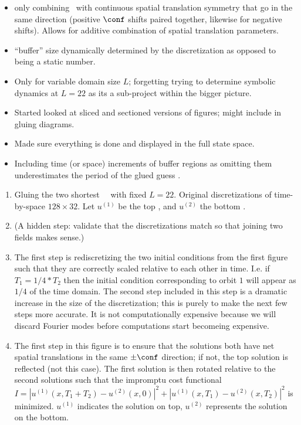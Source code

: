 \begin{description}
{\begin{description}
\begin{itemize}
\item only combining \twots\ with continuous spatial translation symmetry that go in the same direction (positive $\conf$ shifts paired together, likewise for negative shifts). Allows for additive combination of spatial translation parameters.
\item ``buffer'' size dynamically determined by the  discretization as opposed to being a static number.
\item Only for variable domain size $L$; forgetting trying to determine symbolic dynamics at $L=22$ as its a sub-project within
the bigger picture.
\item Started looked at sliced and sectioned versions of figures; might include in gluing diagrams.
\item Made sure everything is done and displayed in the full state space.
\item Including time (or space) increments of buffer regions as omitting them underestimates the period of the glued guess \twot.
\end{itemize}

\begin{enumerate}
\item Gluing the two shortest \rpo\ \twots\ with fixed $L=22$. Original discretizations of time-by-space $128 \times 32$. Let $u^{(1)}$ be the top \twot, and $u^{(2)}$ the bottom \twot.

\item (A hidden step: validate that the discretizations match so that joining two fields makes sense.)
\item  The first step is rediscretizing the two initial conditions from the first figure such that they are correctly scaled relative to each other in time. I.e. if $T_1 = 1/4 * T_2$ then the initial condition corresponding to orbit $1$ will appear as $1/4$ of the time domain. The second step included in this step is a dramatic increase in the size of the discretization; this is purely to make the next few steps more accurate. It is not computationally expensive because we will discard Fourier modes before computations start becomeing expensive.

\item The first step in this figure is to ensure that the solutions both have net spatial translations in the same $\pm \conf$ direction; if not, the top solution is reflected (not this case). The first solution is then rotated relative to the second solutions such that the impromptu cost functional $I = |u^{(1)}(x,T_1+T_2)-u^{(2)}(x,0)|^2 + |u^{(1)}(x,T_1)-u^{(2)}(x,T_2)|^2$ is minimized. $u^{(1)}$ indicates the solution on top, $u^{(2)}$ represents the solution on the bottom.


\end{enumerate}
\end{description}}
\end{description}
